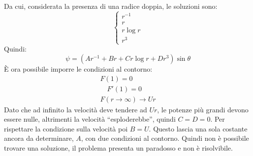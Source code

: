 %
Da cui, considerata la presenza di una radice doppia, le soluzioni sono:
%
	\begin{equation*}
		\left\{
			\begin{aligned}
				r^{-1}\\
				r\\
				r \log{r}\\
				r^3
			\end{aligned}
		\right.
	\end{equation*}
%
Quindi:
%
	\begin{equation*}
		\psi = \left( A r^{-1} + B r + C r \log{r} + D r^3 \right) \sin{\theta}	
	\end{equation*}
%
È ora possibile imporre le condizioni al contorno:
%
	\begin{equation*}
		\begin{gathered}
			F(1) = 0\\
			\quad F'(1) = 0\\
			F(r \rightarrow \infty) \rightarrow U r
		\end{gathered}
	\end{equation*}
%
Dato che ad infinito la velocità deve tendere ad $U r$, le potenze più grandi devono essere nulle, altrimenti la velocità ``esploderebbe'', quindi $C = D = 0$.
Per rispettare la condizione sulla velocità poi $B = U$.
Questo lascia una sola costante ancora da determinare, $A$, con due condizioni al contorno.
Quindi non è possibile trovare una soluzione, il problema presenta un paradosso e non è risolvibile.

